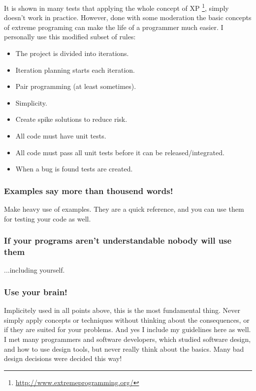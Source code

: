 \documentclass[letterpaper,10pt,english]{manual}
\begin{document}
It is shown in many tests that applying the whole concept of XP \footnote{
\href{http://www.extremeprogramming.org/}{http://www.extremeprogramming.org/}
}, simply
doesn't work in practice.
However, done with some moderation the basic concepts of extreme programing can make
the life of a programmer much easier. I personally use this modified subset of rules:
\begin{itemize}
\item {} 
The project is divided into iterations.

\item {} 
Iteration planning starts each iteration.

\item {} 
Pair programming (at least sometimes).

\item {} 
Simplicity.

\item {} 
Create spike solutions to reduce risk.

\item {} 
All code must have unit tests.

\item {} 
All code must pass all unit tests before it  can be released/integrated.

\item {} 
When a bug is found tests are created.

\end{itemize}


\subsubsection{Examples say more than thousend words!}

Make heavy use of examples. They are a quick reference, and you
can use them for testing your code as well.


\subsubsection{If your programs aren't understandable nobody will use them}

...including yourself.


\subsubsection{Use your brain!}

Implicitely used in all points above, this is the most fundamental thing.
Never simply apply concepts or techniques without thinking about the consequences,
or if they are suited for your problems. And yes I include my guidelines here as well.
I met many programmers and software developers, which studied software design, and
how to use design tools, but never really think about the basics. Many bad design decisions
were decided this way!
\end{document}

